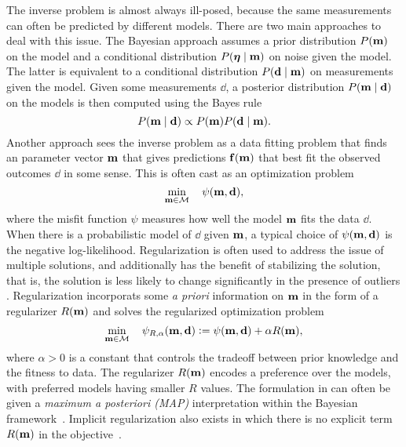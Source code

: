 The inverse problem is almost always ill-posed, because the same measurements
can often be predicted by different models. 
There are two main approaches to deal with this issue.
The Bayesian approach assumes a prior distribution $P({\bf m})$ on the model and a
conditional distribution $P(\bm{\eta} \mid {\bf m})$ on noise given the model.
The latter is equivalent to a conditional distribution $P({\bf d} \mid {\bf m})$ on
measurements given the model.
Given some measurements $\dd$, a posterior distribution 
$P({\bf m} \mid {\bf d})$ on the models is then computed using the Bayes rule
\begin{equation}
	P({\bf m} \mid {\bf d}) 
		\propto P({\bf m}) P({\bf d} \mid {\bf m}).
\end{equation}
Another approach sees the inverse problem as a data fitting problem that finds
an parameter vector ${\bf m}$ that gives predictions ${\bf f}({\bf m})$ that best fit the
observed outcomes $\dd$ in some sense.
This is often cast as an optimization problem
\begin{equation} \label{eq:invopt}
	\min_{{\bf m} \in {\cal M}}\quad 
		\psi({\bf m}, {\bf d}),
\end{equation}
where the misfit function $\psi$ measures how well the model ${\bf m}$ fits the data
$\dd$.
When there is a probabilistic model of $\dd$ given ${\bf m}$, a typical choice of
$\psi({\bf m}, {\bf d})$ is the negative log-likelihood. 
Regularization is often used to address the issue of multiple solutions, and 
additionally has the benefit of stabilizing the solution, that is, the
solution is less likely to change significantly in the presence of outliers
\cite{vogelbook,ehn1, archer1995some}. 
Regularization incorporats some \textit{a priori} information on ${\bf m}$ in the
form of a regularizer $R({\bf m})$ and solves the regularized optimization
problem
\begin{equation} \label{eq:reg_invopt1}
	\min_{{\bf m} \in {\cal M}}\quad 
		\psi_{R,\alpha}({\bf m}, {\bf d}) 
			\mathrel{\mathop:}= \psi({\bf m}, {\bf d}) + \alpha R({\bf m}),
\end{equation}
where $\alpha > 0$ is a constant that controls the tradeoff between prior
knowledge and the fitness to data.
The regularizer $R({\bf m})$ encodes a preference over the models, with preferred
models having smaller $R$ values.
The formulation in  can often be given a \textit{maximum a
posteriori (MAP)} interpretation within the Bayesian framework~\cite{scharf1991statistical}. 
Implicit regularization also exists in which there is no explicit term $R({\bf m})$
in the objective~\cite{hansen1998,doas, doas5,rieder2005,rieder2010,hanke1}.

